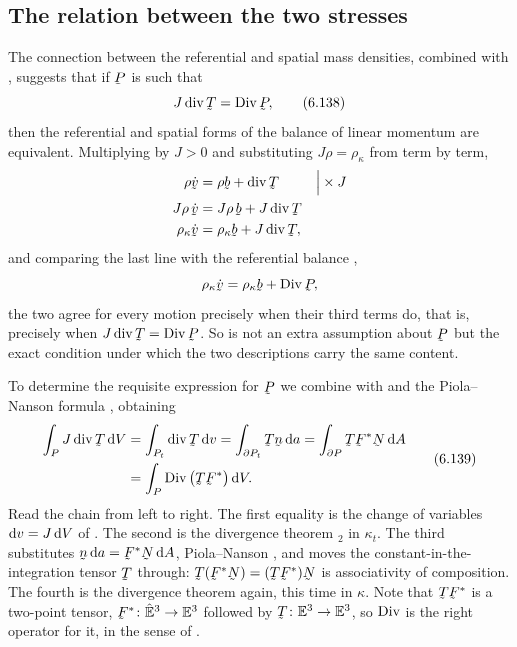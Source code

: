 \subsection*{The relation between the two stresses}

The connection  between the referential and spatial mass
densities, combined with , suggests that if $\bP$ is such
that
\begin{equation}
   J\dvg\bT=\Dvg\bP ,
   \tag{6.138}\label{eq:6.138}
\end{equation}
then the referential and spatial forms of the balance of linear
momentum are equivalent. Multiplying  by $J>0$ and
substituting $J\rho=\rho_{\kappa}$ from  term by term,
\[
\begin{aligned}
   \rho\dot\bv&=\rho\bb+\dvg\bT
   &&\Big|\times J\\
   J\rho\,\dot\bv&=J\rho\,\bb+J\dvg\bT\\
   \rho_{\kappa}\dot\bv&=\rho_{\kappa}\bb+J\dvg\bT ,
\end{aligned}
\]
and comparing the last line with the referential balance ,
\[
   \rho_{\kappa}\dot\bv=\rho_{\kappa}\bb+\Dvg\bP ,
\]
the two agree for every motion precisely when their third terms do,
that is, precisely when $J\dvg\bT=\Dvg\bP$. So  is not an
extra assumption about $\bP$ but the exact condition under which the
two descriptions carry the same content.


To determine the requisite expression for $\bP$ we combine 
with  and the Piola--Nanson formula , obtaining
\begin{equation}
\begin{aligned}
   \int_{P}J\dvg\bT\,\dl V
   &=\int_{P_{t}}\dvg\bT\,\dl v
    =\int_{\partial P_{t}}\bT\bn\,\dl a
    =\int_{\partial P}\bT\bF^{*}\bN\,\dl A\\
   &=\int_{P}\Dvg\big(\bT\bF^{*}\big)\,\dl V .
\end{aligned}
   \tag{6.139}\label{eq:6.139}
\end{equation}
Read the chain from left to right. The first equality is the change of
variables $\mathrm{d} v=J\,\mathrm{d} V$ of . The second is the divergence
theorem $_{2}$ in $\kappa_{t}$. The third substitutes
$\bn\,\dl a=\bF^{*}\bN\,\dl A$, Piola--Nanson , and moves the
constant-in-the-integration tensor $\bT$ through:
$\bT(\bF^{*}\bN)=(\bT\bF^{*})\bN$ is associativity of composition. The
fourth is the divergence theorem again, this time in $\kappa$. Note
that $\bT\bF^{*}$ is a two-point tensor, $\bF^{*}\colon\hVt\to\Vt$
followed by $\bT\colon\Vt\to\Vt$, so $\operatorname{Div}$ is the right operator for
it, in the sense of .

